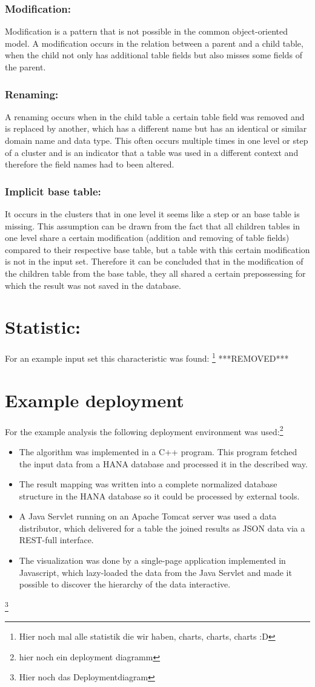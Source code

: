 \documentclass[10pt, journal, twocolumn]{IEEEtran}
\begin{document}
\subsubsection{Modification:}
Modification is a pattern that is not possible in the common object-oriented model. A modification occurs in the relation between a parent and a child table, when the child not only has additional table fields but also misses some fields of the parent.
\subsubsection{Renaming:}
A renaming occurs when in the child table a certain table field was removed and is replaced by another, which has a different name but has an identical or similar domain name and data type. This often occurs multiple times in one level or step of a cluster and is an indicator that a table was used in a different context and therefore the field names had to been altered.
\subsubsection{Implicit base table:}
It occurs in the clusters that in one level it seems like a step or an base table is missing. This assumption can be drawn from the fact that all children tables in one level share a certain modification (addition and removing of table fields) compared to their respective base table, but a table with this certain modification is not in the input set. Therefore it can be concluded that in the modification of the children table from the base table, they all shared a certain prepossessing for which the result was not saved in the database.
\section{Statistic:}
For an example input set this characteristic was found:
\footnote{Hier noch mal alle statistik die wir haben, charts, charts, charts :D }
***REMOVED***
\section{Example deployment}
For the example analysis the following deployment environment was used:\footnote{hier noch ein deployment diagramm}
\begin{itemize}
\item The algorithm was implemented in a C++ program. This program fetched the input data from a HANA database and processed it in the described way.
\item The result mapping was written into a complete normalized database structure in the HANA database so it could be processed by external tools.
\item A Java Servlet running on an Apache Tomcat server was used a data distributor, which delivered for a table the joined results as JSON data via a REST-full interface.
\item The visualization was done by a single-page application implemented in Javascript, which lazy-loaded the data from the Java Servlet and made it possible to discover the hierarchy of the data interactive.
\end{itemize}
\footnote{Hier noch das Deploymentdiagram }
\end{document}
